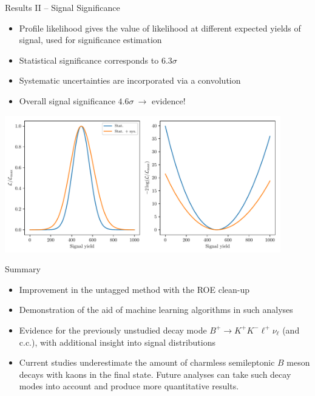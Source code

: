 \documentclass[serif]{beamer}
\begin{document}
\begin{frame}[t]{Results II -- Signal Significance}
\vspace{-3mm}
\small

\begin{itemize}
	\item Profile likelihood gives the value of likelihood at different expected yields of signal, used for significance estimation
	\item Statistical significance corresponds to $6.3\sigma$
	\item Systematic uncertainties are incorporated via a convolution
	\item Overall signal significance $4.6\sigma~\to$ evidence!
\end{itemize}

\vspace{-2mm}

\begin{center}
	\includegraphics[width=0.9\textwidth]{fig/significance}
\end{center}

\end{frame}



\begin{frame}[t]{Summary}
\begin{block}{}
\begin{itemize}
	\item Improvement in the untagged method with the ROE clean-up
	\item Demonstration of the aid of machine learning algorithms in such analyses
	\item Evidence for the previously unstudied decay mode $B^+ \to K^+ K^- \ell^+ \nu_\ell$ (and c.c.), with additional insight into signal distributions
	\item Current studies underestimate the amount of charmless semileptonic $B$ meson decays with kaons in the final state. Future analyses can take such decay modes into account and produce more quantitative results.
\end{itemize}
\end{block}
\end{frame}
\end{document}
